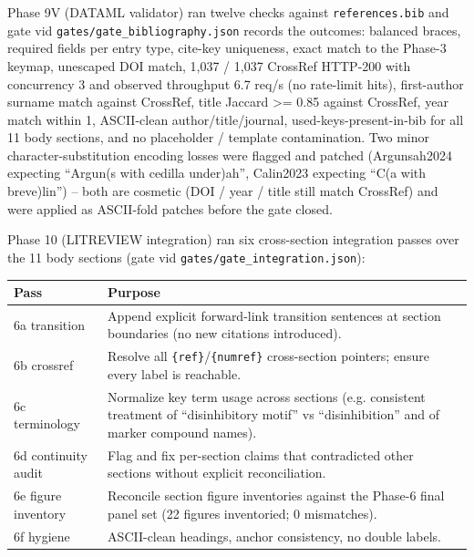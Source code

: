 \documentclass[11pt]{article}
\begin{document}
Phase 9V (DATAML validator) ran twelve checks against \texttt{references.bib} and gate vid \texttt{gates/gate\_bibliography.json} records the outcomes: balanced braces, required fields per entry type, cite-key uniqueness, exact match to the Phase-3 keymap, unescaped DOI match, 1,037 / 1,037 CrossRef HTTP-200 with concurrency 3 and observed throughput 6.7 req/s (no rate-limit hits), first-author surname match against CrossRef, title Jaccard \textgreater = 0.85 against CrossRef, year match within 1, ASCII-clean author/title/journal, used-keys-present-in-bib for all 11 body sections, and no placeholder / template contamination. Two minor character-substitution encoding losses were flagged and patched (Argunsah2024 expecting ``Argun(s with cedilla under)ah'', Calin2023 expecting ``C(a with breve)lin'') -- both are cosmetic (DOI / year / title still match CrossRef) and were applied as ASCII-fold patches before the gate closed.

Phase 10 (LITREVIEW integration) ran six cross-section integration passes over the 11 body sections (gate vid \texttt{gates/gate\_integration.json}):

\bigskip\noindent
\begin{tabular}{p{}p{}}
\toprule
Pass & Purpose \\
\hline
6a transition & Append explicit forward-link transition sentences at section boundaries (no new citations introduced). \\
6b crossref & Resolve all \texttt{\{ref\}}/\texttt{\{numref\}} cross-section pointers; ensure every label is reachable. \\
6c terminology & Normalize key term usage across sections (e.g. consistent treatment of ``disinhibitory motif'' vs ``disinhibition'' and of marker compound names). \\
6d continuity audit & Flag and fix per-section claims that contradicted other sections without explicit reconciliation. \\
6e figure inventory & Reconcile section figure inventories against the Phase-6 final panel set (22 figures inventoried; 0 mismatches). \\
6f hygiene & ASCII-clean headings, anchor consistency, no double labels. \\
\bottomrule
\end{tabular}

\bigskip
\end{document}
